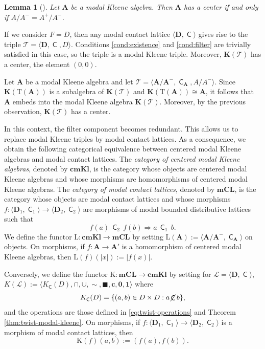 \documentclass[10pt,a4paper]{amsart}
\newtheorem{lemma}[theorem]{Lemma}
\DeclareMathOperator{\con}{\mathsf{C}}
\DeclareMathOperator{\notcon}{\cancel{ \con}}
\newcommand{\cbf}{\mathbf{c}}
\newcommand{\one}{\mathbf{1}}
\newcommand{\zero}{\mathbf{0}}
\newcommand{\A}{\mathbf{A}}
\newcommand{\D}{\mathbf{D}}
\newcommand{\boxn}{\blacksquare}
\begin{document}
 \begin{lemma}[\cite{cignoli1986class}]
 \label{lem:pos-eq-quotient}
     Let $\A$ be a modal Kleene algebra. Then $\A$ has a center if and only if $A/A^{-} = A^{+} /A^{-}$.
 \end{lemma}

If we consider $F = D$, then any modal contact lattice $\langle \D, \con \rangle$ gives rise to the triple $\mathcal{T}=\langle \D, \con, D \rangle$. Conditions \eqref{cond:existence} and \eqref{cond:filter} are trivially satisfied in this case, so the triple is a modal Kleene triple. Moreover, $\mathbf{K}(\mathcal{T})$ has a center, the element $(0,0)$.

Let $\A$ be a modal Kleene algebra and let $\mathcal{T}=\langle \A/\A^{-}, \con_\A,A/A^{-}\rangle$. Since $\mathbf{K}(\mathrm{T}(\A))$ is a subalgebra of $\mathbf{K}(\mathcal{T})$ and $\mathbf{K}(\mathrm{T}(\A))\cong\A$, it follows that $\A$ embeds into the modal Kleene algebra $\mathbf{K}(\mathcal{T})$. Moreover, by the previous observation, $\mathbf{K}(\mathcal{T})$ has a center.

In this context, the filter component becomes redundant. This allows us to replace modal Kleene triples by modal contact lattices. As a consequence, we obtain the following categorical equivalence between centered modal Kleene algebras and modal contact lattices. The \emph{category of centered modal Kleene algebras}, denoted by $\mathbf{cmKl}$, is the category whose objects are centered modal Kleene
algebras and whose morphisms are homomorphisms of centered modal Kleene algebras. The \emph{category of modal contact lattices}, denoted by $\mathbf{mCL}$, is the category whose objects are modal contact lattices and whose morphisms $f:\langle\D_1,\con_1\rangle\to\langle\D_2,\con_2\rangle$ are morphisms of modal bounded distributive lattices such that
\[
f(a)\,\con_2\,f(b)\Longrightarrow a\,\con_1\,b.
\]
We define the functor $\mathrm{L}:\mathbf{cmKl}\longrightarrow\mathbf{mCL}$
by setting $\mathrm{L}(\A):=\langle \A/\A^{-},\con_\A\rangle$ on objects. On morphisms, if $f:\A\to\A'$
is a homomorphism of centered modal Kleene algebras, then $\mathrm{L}(f)(|x|):=|f(x)|$.

Conversely, we define the functor $\mathrm{K}:\mathbf{mCL}\longrightarrow\mathbf{cmKl}$
by setting for $\mathcal{L}=\langle\D,\con\rangle $, $K(\mathcal{L}):=\langle K_{\con}(D),\cap,\cup,\sim ,\boxn,\cbf,\zero,\one\rangle$ where 
\[
K_{\con}(D)=\{(a,b)\in D\times D: a\notcon b\},
\]
and the operations are those defined in \ref{eq:twist-operations} and Theorem \ref{thm:twist-modal-kleene}. On morphisms, if $f:\langle\D_1,\con_1\rangle\to\langle\D_2,\con_2\rangle$
is a morphism of modal contact lattices, then
\[
\mathrm{K}(f)(a,b):=(f(a),f(b)).
\]
\end{document}
